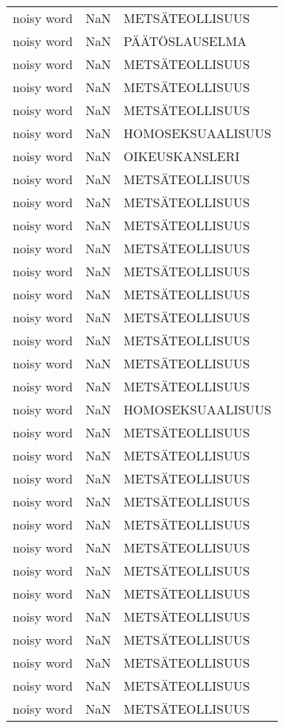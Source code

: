 \begin{tabular}{lll}
 noisy word &  NaN &       METSÄTEOLLISUUS \\
 noisy word &  NaN &        PÄÄTÖSLAUSELMA \\
 noisy word &  NaN &       METSÄTEOLLISUUS \\
 noisy word &  NaN &       METSÄTEOLLISUUS \\
 noisy word &  NaN &       METSÄTEOLLISUUS \\
 noisy word &  NaN &     HOMOSEKSUAALISUUS \\
 noisy word &  NaN &        OIKEUSKANSLERI \\
 noisy word &  NaN &       METSÄTEOLLISUUS \\
 noisy word &  NaN &       METSÄTEOLLISUUS \\
 noisy word &  NaN &       METSÄTEOLLISUUS \\
 noisy word &  NaN &       METSÄTEOLLISUUS \\
 noisy word &  NaN &       METSÄTEOLLISUUS \\
 noisy word &  NaN &       METSÄTEOLLISUUS \\
 noisy word &  NaN &       METSÄTEOLLISUUS \\
 noisy word &  NaN &       METSÄTEOLLISUUS \\
 noisy word &  NaN &       METSÄTEOLLISUUS \\
 noisy word &  NaN &       METSÄTEOLLISUUS \\
 noisy word &  NaN &     HOMOSEKSUAALISUUS \\
 noisy word &  NaN &       METSÄTEOLLISUUS \\
 noisy word &  NaN &       METSÄTEOLLISUUS \\
 noisy word &  NaN &       METSÄTEOLLISUUS \\
 noisy word &  NaN &       METSÄTEOLLISUUS \\
 noisy word &  NaN &       METSÄTEOLLISUUS \\
 noisy word &  NaN &       METSÄTEOLLISUUS \\
 noisy word &  NaN &       METSÄTEOLLISUUS \\
 noisy word &  NaN &       METSÄTEOLLISUUS \\
 noisy word &  NaN &       METSÄTEOLLISUUS \\
 noisy word &  NaN &       METSÄTEOLLISUUS \\
 noisy word &  NaN &       METSÄTEOLLISUUS \\
 noisy word &  NaN &       METSÄTEOLLISUUS \\
 noisy word &  NaN &       METSÄTEOLLISUUS \\

\end{tabular}
